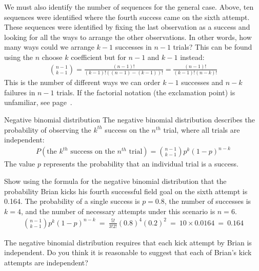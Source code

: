 We must also identify the number of sequences for the general case. Above, ten sequences were identified where the fourth success came on the sixth attempt. These sequences were identified by fixing the last observation as a success and looking for all the ways to arrange the other observations. In other words, how many ways could we arrange $k-1$ successes in $n-1$ trials? This can be found using the $n$ choose $k$ coefficient but for $n-1$ and $k-1$ instead:
\begin{align*}
{n-1 \choose k-1} = \frac{(n-1)!}{(k-1)! \left((n-1) - (k-1)\right)!} = \frac{(n-1)!}{(k-1)! \left(n - k\right)!}
\end{align*}
This is the number of different ways we can order $k-1$ successes and $n-k$ failures in $n-1$ trials. If the factorial notation (the exclamation point) is unfamiliar, see page~\pageref{factorialDefinitionInTheBinomialSection}.

\begin{onebox}{Negative binomial distribution}
  The negative binomial distribution describes the
  probability of observing the $k^{th}$ success on
  the $n^{th}$ trial, where all trials are independent:
  \begin{align*}
  P(\text{the $k^{th}$ success on the $n^{th}$ trial})
      = {n-1 \choose k-1} p^{k}(1-p)^{n-k}
  \end{align*}
  The value $p$ represents the probability that
  an individual trial is a success.
\end{onebox}

\begin{examplewrap}
\begin{nexample}{Show using the formula for the negative binomial distribution that the probability Brian kicks his fourth successful field goal on the sixth attempt is 0.164.}
The probability of a single success is $p=0.8$, the number of successes is $k=4$, and the number of necessary attempts under this scenario is $n=6$.
\begin{align*}
{n-1 \choose k-1}p^k(1-p)^{n-k}\ 
	=\ \frac{5!}{3!2!} (0.8)^4 (0.2)^2\ 
	=\ 10\times 0.0164\ 
	=\ 0.164
\end{align*}
\end{nexample}
\end{examplewrap}

\begin{exercisewrap}
\begin{nexercise}
The negative binomial distribution requires that each kick attempt by Brian is independent. Do you think it is reasonable to suggest that each of Brian's kick attempts are independent?\footnotemark
\end{nexercise}
\end{exercisewrap}


